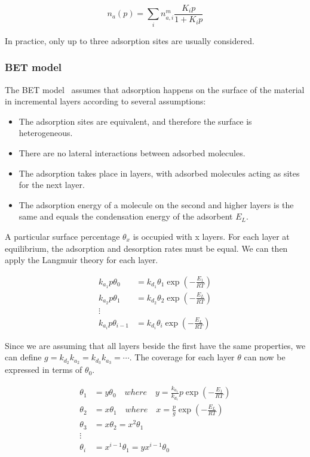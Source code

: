 \begin{equation}\label{eqn:pyg:langmulti}
    n_a(p) = \sum_i n_{a,i}^m\frac{K_i p}{1+K_i p}
\end{equation}

In practice, only up to three adsorption sites are usually considered.


\subsubsection{BET model}

The BET model~\cite{brunauerAdsorptionGasesMultimolecular1938}
assumes that adsorption happens on the surface of the material in
incremental layers according to several assumptions:

\begin{itemize}
    \item The adsorption sites are equivalent, and therefore the surface is heterogeneous.
    \item There are no lateral interactions between adsorbed molecules.
    \item The adsorption takes place in layers, with adsorbed molecules 
    acting as sites for the next layer.
    \item The adsorption energy of a molecule on the second and higher layers
    is the same and equals the condensation energy of the adsorbent \(E_L\).
\end{itemize}

A particular surface percentage \(\theta_x\) is occupied with x layers.
For each layer at equilibrium, the adsorption and desorption rates must be equal. 
We can then apply the Langmuir theory for each layer.

\begin{align}
    k_{a_1} p \theta_0 &= k_{d_1} \theta_1 \exp{(-\frac{E_1}{RT})} \\
    k_{a_2} p \theta_1 &= k_{d_2} \theta_2 \exp{(-\frac{E_L}{RT})} \\
    \vdots \nonumber \\
    k_{a_i} p \theta_{i-1} &= k_{d_i} \theta_i \exp{(-\frac{E_L}{RT})}
\end{align}

Since we are assuming that all layers beside the first have the same properties,
we can define \(g= {k_{d_2}}{k_{a_2}} = {k_{d_3}}{k_{a_3}} = \cdots\).
The coverage for each layer \(\theta\) can now be expressed in terms of \(\theta_0\).

\begin{align}
    \theta_1 &= y \theta_0 \quad where \quad y = \frac{k_{a_1}}{k_{d_1}} p \exp{(-\frac{E_1}{RT})} \\
    \theta_2 &= x \theta_1 \quad where \quad x = \frac{p}{g} \exp{(-\frac{E_L}{RT})} \\
    \theta_3 &= x \theta_2 = x^2 \theta_1 \\
    \vdots \nonumber \\
    \theta_i &= x^{i-1} \theta_1 = y x^{i-1} \theta_0
\end{align}

